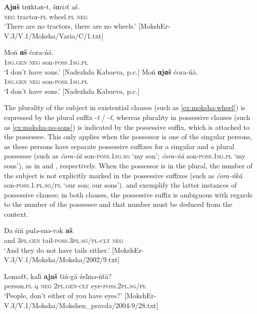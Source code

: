 \documentclass[output=paper]{langsci/langscibook}
\begin{document}
\ea\label{ex:moksha-wheel}
\gll \textbf{Ajɑš} trɑktə\textsc{r}-t, šɑri\textsc{j}ť aš.\\
\textsc{neg} tractor-\textsc{pl} wheel.\textsc{pl} \textsc{neg}\\
\glt `There are no tractors, there are no wheels.' [MokshEr-V.3/V.1/Moksha/Varia/C/1.txt]
\z

\ea\label{ex:moksha-no-sons}
\ea\label{ex:moksha-no-sons-1}
\gll Moń \textbf{ɑš} ćora-ńä.\\
\textsc{1sg.gen}    \textsc{neg}    son-\textsc{poss.1sg.pl}\\
\glt `I don't have sons.' [Nadezhda Kabaeva, p.c.]
\ex\label{ex:moksha-no-sons-2}
\gll Moń \textbf{ɑjɑš} ćora-ńä.\\
\textsc{1sg.gen}    \textsc{neg}    son-\textsc{poss.1sg.pl}\\
\glt `I don't have sons.' [Nadezhda Kabaeva, p.c.]
\z\z

  The plurality of the subject in existential clauses (such as \ref{ex:moksha-wheel}) is expressed by the plural suffix -\textit{t} / -\textit{ť}, whereas plurality in possessive clauses (such as \ref{ex:moksha-no-sons}) is indicated by the possessive suffix, which is attached to the possessee. This only applies when the possessor is one of the singular persons, as these persons have separate possessive suffixes for a singular and a plural possessee (such as \textit{ćora-źä} son-\textsc{poss.1sg.sg} `my son'; \textit{ćora-ńä} son-\textsc{poss.1sg.pl} `my sons'), as in  and , respectively. When the possessor is in the plural, the number of the subject is not explicitly marked in the possessive suffixes (such as \textit{ćora-ńkä} son-\textsc{poss.1.pl.sg/pl} `our son; our sons').  and  exemplify the latter instances of possessive clauses; in both clauses, the possessive suffix is ambiguous with regards to the number of the possessee and that number must be deduced from the context. 

\ea\label{ex:moksha-tail}
\gll Da śiń pulə-snə-vək \textbf{aš}.\\
and  3\textsc{pl.gen}    tail-\textsc{poss.3pl.sg/pl-clt}  \textsc{neg}\\
\glt `And they do not have tails either.' [MokshEr-V.3/V.1/Moksha/Moksha/2002/9.txt]
\z

\ea\label{ex:moksha-eye}
\gll Lomaťť, kaľi \textbf{ajaš} ťiń-gä śeľmə-ńťä?\\
person.\textsc{pl}  \textsc{q}      \textsc{neg}  \textsc{2pl.gen-clt}  eye-\textsc{poss.2pl.sg/pl}\\
\glt `People, don't either of you have eyes?' [MokshEr-V.3/V.1/Moksha/Mokshen\_pravda/2004-9/28.txt]
\z
\end{document}
